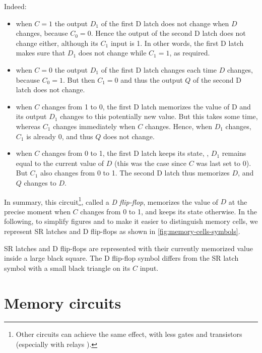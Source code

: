 \noindent Indeed:
\begin{itemize}
  \item when $C=1$ the output $D_1$ of the first D latch does not change when
  $D$ changes, because $C_0=0$. Hence the output of the second D latch does not
  change either, although its $C_1$ input is 1. In other words, the first D
  latch makes sure that $D_1$ does not change while $C_1=1$, as required.

  \item when $C=0$ the output $D_1$ of the first D latch changes each time $D$
  changes, because $C_0=1$. But then $C_1=0$ and thus the output $Q$ of the
  second D latch does not change.

  \item when $C$ changes from 1 to 0, the first D latch memorizes the value of D
  and its output $D_1$ changes to this potentially new value. But this takes
  some time, whereas $C_1$ changes immediately when $C$ changes. Hence, when
  $D_1$ changes, $C_1$ is already 0, and thus $Q$ does not change.

  \item when $C$ changes from 0 to 1, the first D latch keeps its state, \ie,
  $D_1$ remains equal to the current value of $D$ (this was the case since $C$
  was last set to 0). But $C_1$ also changes from 0 to 1. The second D latch
  thus memorizes $D$, and $Q$ changes to $D$.
\end{itemize}

In summary, this circuit\footnote{Other circuits can achieve the same effect,
with less gates and transistors (especially with relays \cite{MerciaRelay}).},
called a {\em D flip-flop}, memorizes the value of $D$ at the precise moment
when $C$ changes from 0 to 1, and keeps its state otherwise. In the following,
to simplify figures and to make it easier to distinguish memory cells, we
represent SR latches and D flip-flops as shown in
\cref{fig:memory-cells-symbols}.

\begin{Figure}
  

  \caption{SR latches and D flip-flops are represented with their currently
  memorized value inside a large black square. The D flip-flop symbol differs
  from the SR latch symbol with a small black triangle on its $C$
  input.}\label{fig:memory-cells-symbols}
\end{Figure}

\section{Memory circuits}

